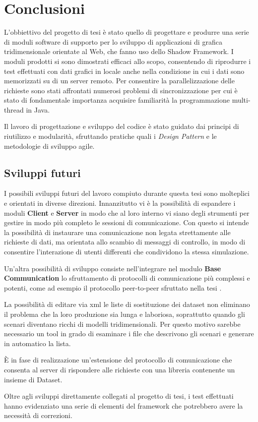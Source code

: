 
\chapter{Conclusioni}
\label{ch:conclusioni}
L'obbiettivo del progetto di tesi \`e stato quello di progettare e produrre una serie di moduli software di supporto per lo sviluppo di applicazioni di grafica tridimensionale orientate al Web, che fanno uso dello Shadow Framework. I moduli prodotti si sono dimostrati efficaci allo scopo, consentendo di riprodurre i test effettuati con dati grafici in locale anche nella condizione in cui i dati sono memorizzati su di un server remoto. 
Per consentire la parallelizzazione delle richieste sono stati affrontati numerosi problemi di sincronizzazione per cui \`e stato di fondamentale importanza acquisire familiarit\`a la programmazione multi-thread in Java.


Il lavoro di progettazione e sviluppo del codice \`e stato guidato dai principi di riutilizzo e modularit\`a, sfruttando pratiche quali i \textit{Design Pattern} e le metodologie di sviluppo agile.



\section{Sviluppi futuri}
I possibili sviluppi futuri del lavoro compiuto durante questa tesi sono molteplici e orientati in diverse direzioni. Innanzitutto vi \`e la possibilit\`a di espandere i moduli \textbf{Client} e \textbf{Server} in modo che al loro interno vi siano degli strumenti per gestire in modo pi\`u completo le sessioni di comunicazione. Con questo si intende la possibilit\`a di instaurare una comunicazione non legata strettamente alle richieste di dati, ma orientata allo scambio di messaggi di controllo, in modo di consentire l'interazione di utenti differenti che condividono la stessa simulazione.

Un'altra possibilit\`a di sviluppo consiste nell'integrare nel modulo \textbf{Base Communication} lo sfruttamento di protocolli di comunicazione pi\`u complessi e potenti, come ad esempio il protocollo peer-to-peer sfruttato nella tesi \cite{tesi:truzzi}.

La possibilit\`a di editare via xml le liste di sostituzione dei dataset non eliminano il problema che la loro produzione sia lunga e laboriosa, soprattutto quando gli scenari diventano ricchi di modelli tridimensionali. Per questo motivo sarebbe necessario un tool in grado di esaminare i file che descrivono gli scenari e generare in automatico la lista.

\`E in fase di realizzazione un'estensione del protocollo di comunicazione che consenta al server di rispondere alle richieste con una libreria contenente un insieme di Dataset.

Oltre agli sviluppi direttamente collegati al progetto di tesi, i test effettuati hanno evidenziato una serie di elementi del framework che potrebbero avere la necessit\`a di correzioni.

